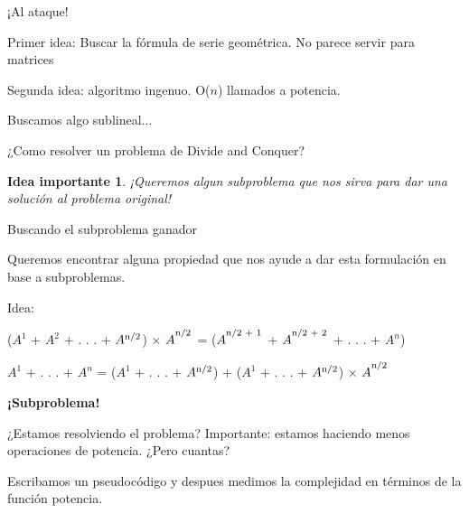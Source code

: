 \documentclass[pdf]{beamer}
\newtheorem{idea}{Idea importante}
\begin{document}
\begin{frame}{¡Al ataque!}
    \par{Primer idea: \pause Buscar la fórmula de serie geométrica. \pause No parece servir para \alert{matrices}}
    \pause
    \vspace{1em}
    \par{Segunda idea: \pause algoritmo ingenuo. \pause \alert{O($n$)} llamados a potencia.}
    \pause
    \vspace{1em}
    \par{Buscamos algo sublineal...}
    \pause
    
    \vspace{1em}
    
    ¿Como resolver un problema de Divide and Conquer?
    
    \pause
    
    \begin{idea}
	¡Queremos algun subproblema que nos sirva para dar una solución al problema original!
    \end{idea}
\end{frame}

\begin{frame}{Buscando el subproblema ganador}
    \par{Queremos encontrar alguna propiedad que nos ayude a dar esta formulación en base a subproblemas.}
    \vspace{1em}
    
    \pause
    
    \par{Idea: }
    
    ($A^1$ + $A^2$ + . . . + $A\textsuperscript{n/2}$) $\times$ $A^\textsuperscript{n/2}$ = ($A^\textsuperscript{n/2 + 1}$ + $A^\textsuperscript{n/2 + 2}$ + . . . + $A^n$)
    
    \pause
    \vspace{1em}
    
    \par{$A^1$ + . . . + $A^n$ = \alert<4>{($A^1$ + . . . + $A\textsuperscript{n/2}$)} + ($A^1$ + . . . + $A\textsuperscript{n/2}$) $\times$ $A^\textsuperscript{n/2}$}
    \pause
    \par{\textbf{¡Subproblema!}}
    
    
\end{frame}

\begin{frame}{¿Estamos resolviendo el problema?}
    Importante: estamos haciendo menos operaciones de potencia. ¿Pero cuantas?
    
    \pause
    \vspace{2em}
    Escribamos un pseudocódigo y despues medimos la complejidad en términos de la función potencia.
    
\end{frame}
\end{document}
